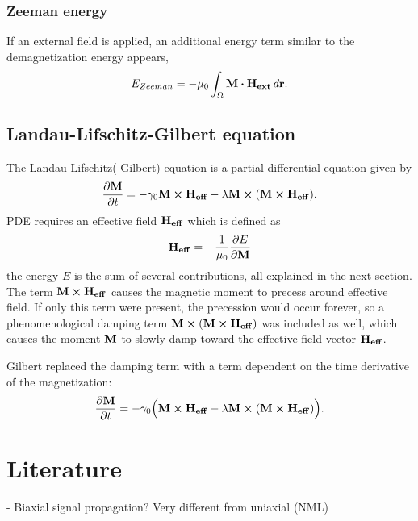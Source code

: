 \documentclass[10pt,a4paper]{article}
\begin{document}
\subsubsection{Zeeman energy}
If an external field is applied, an additional energy term similar to the demagnetization energy appears,
\begin{equation}
    E_{Zeeman} = -\mu_0 \int_\Omega \vb{M} \vdot \vb{H_{ext}} \, d\vb{r} \mathrm{.} \label{eq:Energy_Term_Zeeman}
\end{equation}


\subsection{Landau-Lifschitz-Gilbert equation}
The Landau-Lifschitz(-Gilbert) equation is a partial differential equation given by
\begin{equation}
	\frac{\partial \vb{M}}{\partial t} = - \gamma_0 \vb{M} \cross \vb{H_{eff}} - \lambda \vb{M} \cross (\vb{M} \cross \vb{H_{eff}}) \mathrm{.}
\end{equation}
PDE requires an effective field $\vb{H_{eff}}$ which is defined as
\begin{equation}
	\vb{H_{eff}} = - \frac{1}{\mu_0} \frac{\partial E}{\partial \vb{M}}
\end{equation}
the energy $E$ is the sum of several contributions, all explained in the next section.
The term $\vb{M} \cross \vb{H_{eff}}$ causes the magnetic moment to precess around effective field. If only this term were present, the precession would occur forever, so a phenomenological damping term $\vb{M} \cross (\vb{M} \cross \vb{H_{eff}})$ was included as well, which causes the moment $\vb{M}$ to slowly damp toward the effective field vector $\vb{H_{eff}}$.~\cite{NML_Carlton}

Gilbert \cite{Gilbert1956} replaced the damping term with a term dependent on the time derivative of the magnetization:
\begin{equation}
	\frac{\partial \vb{M}}{\partial t} = - \gamma_0 \Big( \vb{M} \cross \vb{H_{eff}} - \lambda \vb{M} \cross (\vb{M} \cross \vb{H_{eff}}) \Big) \mathrm{.}
\end{equation}

\section{Literature}
- Biaxial signal propagation? Very different from uniaxial (NML)
\end{document}
